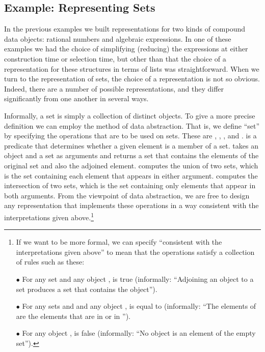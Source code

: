 \subsection{Example: Representing Sets}
\label{Section 2.3.3}

In the previous examples we built representations for two kinds of compound
data objects: rational numbers and algebraic expressions.  In one of these
examples we had the choice of simplifying (reducing) the expressions at either
construction time or selection time, but other than that the choice of a
representation for these structures in terms of lists was straightforward. When
we turn to the representation of sets, the choice of a representation is not so
obvious.  Indeed, there are a number of possible representations, and they
differ significantly from one another in several ways.

Informally, a set is simply a collection of distinct objects.  To give a more
precise definition we can employ the method of data abstraction.  That is, we
define ``set'' by specifying the operations that are to be used on sets.  These
are , , , and
.   is a predicate that determines
whether a given element is a member of a set.   takes an
object and a set as arguments and returns a set that contains the elements of
the original set and also the adjoined element.   computes the
union of two sets, which is the set containing each element that appears in
either argument.   computes the intersection of two
sets, which is the set containing only elements that appear in both arguments.
From the viewpoint of data abstraction, we are free to design any
representation that implements these operations in a way consistent with the
interpretations given above.\footnote{If we want to be more formal, we can
specify ``consistent with the interpretations given above'' to mean that the
operations satisfy a collection of rules such as these:

\noindent
\( \bullet \) For any set  and any object ,
is true (informally: ``Adjoining an object to a
set produces a set that contains the object'').

\noindent
\( \bullet \) For any sets  and  and any object ,
is equal to
(informally: ``The elements of  are the elements that
are in  or in '').

\noindent
\( \bullet \) For any object ,
is false (informally: ``No object is an element of the empty set'').
}


